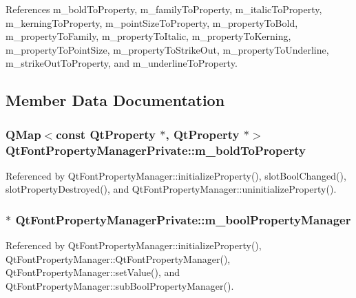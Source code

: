 References m\+\_\+bold\+To\+Property, m\+\_\+family\+To\+Property, m\+\_\+italic\+To\+Property, m\+\_\+kerning\+To\+Property, m\+\_\+point\+Size\+To\+Property, m\+\_\+property\+To\+Bold, m\+\_\+property\+To\+Family, m\+\_\+property\+To\+Italic, m\+\_\+property\+To\+Kerning, m\+\_\+property\+To\+Point\+Size, m\+\_\+property\+To\+Strike\+Out, m\+\_\+property\+To\+Underline, m\+\_\+strike\+Out\+To\+Property, and m\+\_\+underline\+To\+Property.



\subsection{Member Data Documentation}
\subsubsection[{m\+\_\+bold\+To\+Property}]{\setlength{\rightskip}{0pt plus 5cm}Q\+Map$<$const {\bf Qt\+Property} $\ast$, {\bf Qt\+Property} $\ast$$>$ Qt\+Font\+Property\+Manager\+Private\+::m\+\_\+bold\+To\+Property}\label{classQtFontPropertyManagerPrivate_a22c399d0205fe58b43caa8a1b45ffd11}


Referenced by Qt\+Font\+Property\+Manager\+::initialize\+Property(), slot\+Bool\+Changed(), slot\+Property\+Destroyed(), and Qt\+Font\+Property\+Manager\+::uninitialize\+Property().

\subsubsection[{m\+\_\+bool\+Property\+Manager}]{$\ast$ Qt\+Font\+Property\+Manager\+Private\+::m\+\_\+bool\+Property\+Manager}\label{classQtFontPropertyManagerPrivate_af3c3530fe8957dad1b75409156a54109}


Referenced by Qt\+Font\+Property\+Manager\+::initialize\+Property(), Qt\+Font\+Property\+Manager\+::\+Qt\+Font\+Property\+Manager(), Qt\+Font\+Property\+Manager\+::set\+Value(), and Qt\+Font\+Property\+Manager\+::sub\+Bool\+Property\+Manager().

